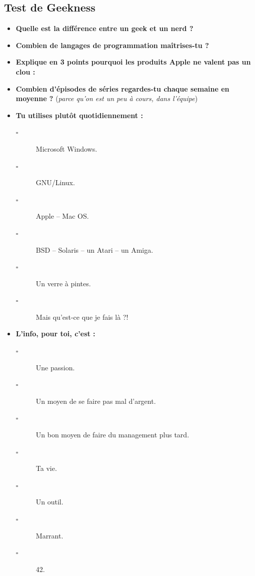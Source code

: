 \subsection*{Test de Geekness}
\begin{itemize}

    \item \textbf{Quelle est la différence entre un geek et un nerd ?}
    \vspace{5cm}
	
    \item \textbf{Combien de langages de programmation maîtrises-tu ?}
    \vspace{4cm}
	
    \item \textbf{Explique en 3 points pourquoi les produits Apple ne valent
	pas un clou :}
    \vspace{4cm}

    \newpage

    \item \textbf{Combien d'épisodes de séries regardes-tu chaque
	semaine en moyenne ?} (\emph{parce qu'on est un peu à cours, dans l'équipe})
    \vspace{3cm}
    
    \item \textbf{Tu utilises plutôt quotidiennement :}
    \begin{description}
	\item[$\square$] Microsoft Windows.
	\item[$\square$] GNU/Linux.
	\item[$\square$] Apple -- Mac OS.
	\item[$\square$] BSD -- Solaris -- un Atari -- un Amiga.
	\item[$\square$] Un verre à pintes.
	\item[$\square$] Mais qu'est-ce que je fais là ?!
    \end{description}
	\vspace{2em}
	
    \item \textbf{L'info, pour toi, c'est :}
    \begin{description}
	\item[$\square$] Une passion.
	\item[$\square$] Un moyen de se faire pas mal d'argent.
	\item[$\square$] Un bon moyen de faire du management plus tard.
	\item[$\square$] Ta vie.
	\item[$\square$] Un outil.
	\item[$\square$] Marrant.
	\item[$\square$] 42.
    \end{description}
	\vspace{2em}
	

\end{itemize}
